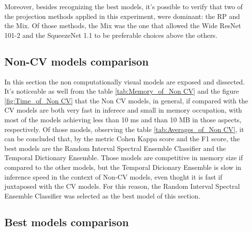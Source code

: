 Moreover, besides recognizing the best models, it's possible to verify that two of the projection methods applied in this experiment, were dominant: the \acrshort{RP} and the \acrshort{Mix}. Of those methods, the \acrshort{Mix} was the one that allowed the Wide ResNet 101-2 and the SqueezeNet 1.1 to be preferable choices above the others.	






\FloatBarrier

\subsection{Non-CV models comparison}

In this section the non computationally visual models are exposed and dissected. It's noticeable as well from the table \ref{tab:Memory_of_Non CV} and the figure \ref{fig:Time_of_Non CV} that the Non \acrshort{CV} models, in general, if compared with the \acrshort{CV} models are both very fast in inferece and small in memory occupation, with most of the models achieving less than 10 ms and than 10 MB in those aspects, respectively. Of those models, observing the table \ref{tab:Averages_of_Non CV}, it can be concluded that, by the metric Cohen Kappa score and the F1 score, the best models are the Random Interval Spectral Ensemble Classifier and the Temporal Dictionary Ensemble. Those models are competitive in memory size if compared to the other models, but the Temporal Dicionary Ensemble is slow in inference speed in the context of Non-\acrshort{CV} models, even thoght it is fast if juxtaposed with the \acrshort{CV} models. For this reason, the Random Interval Spectral Ensemble Classifier was selected as the best model of this section.






\FloatBarrier

\subsection{Best models comparison}

